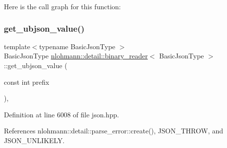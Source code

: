 Here is the call graph for this function\+:
\mbox{\label{classnlohmann_1_1detail_1_1binary__reader_ad8507c0dd14bbddc76c7937c0305a15a}} 
\subsubsection{\texorpdfstring{get\+\_\+ubjson\+\_\+value()}{get\_ubjson\_value()}}
{\footnotesize\ttfamily template$<$typename Basic\+Json\+Type $>$ \\
Basic\+Json\+Type \hyperlink{classnlohmann_1_1detail_1_1binary__reader}{nlohmann\+::detail\+::binary\+\_\+reader}$<$ Basic\+Json\+Type $>$\+::get\+\_\+ubjson\+\_\+value (\begin{DoxyParamCaption}\item[{const int}]{prefix }\end{DoxyParamCaption})\hspace{0.3cm}{\ttfamily [inline]}, {\ttfamily [private]}}



Definition at line 6008 of file json.\+hpp.



References nlohmann\+::detail\+::parse\+\_\+error\+::create(), J\+S\+O\+N\+\_\+\+T\+H\+R\+OW, and J\+S\+O\+N\+\_\+\+U\+N\+L\+I\+K\+E\+LY.


